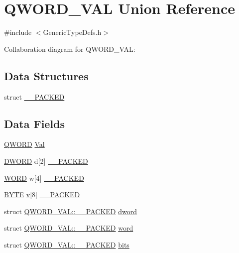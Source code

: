 \hypertarget{union_q_w_o_r_d___v_a_l}{}\section{Q\+W\+O\+R\+D\+\_\+\+V\+A\+L Union Reference}
\label{union_q_w_o_r_d___v_a_l}


{\ttfamily \#include $<$Generic\+Type\+Defs.\+h$>$}



Collaboration diagram for Q\+W\+O\+R\+D\+\_\+\+V\+A\+L\+:
\subsection*{Data Structures}
\begin{DoxyCompactItemize}
\item 
struct \hyperlink{struct_q_w_o_r_d___v_a_l_1_1_____p_a_c_k_e_d}{\+\_\+\+\_\+\+P\+A\+C\+K\+E\+D}
\end{DoxyCompactItemize}
\subsection*{Data Fields}
\begin{DoxyCompactItemize}
\item 
\hyperlink{_generic_type_defs_8h_a15f7b00103384a4b1d6f6e3602be5b15}{Q\+W\+O\+R\+D} \hyperlink{union_q_w_o_r_d___v_a_l_a2b8d25b6ac4b4698966996294ece4580}{Val}
\item 
\hyperlink{_generic_type_defs_8h_ad342ac907eb044443153a22f964bf0af}{D\+W\+O\+R\+D} d\mbox{[}2\mbox{]} \hyperlink{union_q_w_o_r_d___v_a_l_a4c364fe30e2e45ad4e325fb041a8c2cf}{\+\_\+\+\_\+\+P\+A\+C\+K\+E\+D}
\item 
\hyperlink{_generic_type_defs_8h_a2b0e863dadf920709ec53d9088ee7c91}{W\+O\+R\+D} w\mbox{[}4\mbox{]} \hyperlink{union_q_w_o_r_d___v_a_l_abdbe55bfd3a80f5c6cf005d7e37910a7}{\+\_\+\+\_\+\+P\+A\+C\+K\+E\+D}
\item 
\hyperlink{_generic_type_defs_8h_a4ae1dab0fb4b072a66584546209e7d58}{B\+Y\+T\+E} \hyperlink{_s_p_i_flash_8c_a51a3fc6fe361f8f5a7a91799fecd2c9a}{v}\mbox{[}8\mbox{]} \hyperlink{union_q_w_o_r_d___v_a_l_a884b392c82d52eb89059b87a5d288ccf}{\+\_\+\+\_\+\+P\+A\+C\+K\+E\+D}
\item 
struct \hyperlink{struct_q_w_o_r_d___v_a_l_1_1_____p_a_c_k_e_d}{Q\+W\+O\+R\+D\+\_\+\+V\+A\+L\+::\+\_\+\+\_\+\+P\+A\+C\+K\+E\+D} \hyperlink{union_q_w_o_r_d___v_a_l_ab7b7833e9baba96f01a92061705f9684}{dword}
\item 
struct \hyperlink{struct_q_w_o_r_d___v_a_l_1_1_____p_a_c_k_e_d}{Q\+W\+O\+R\+D\+\_\+\+V\+A\+L\+::\+\_\+\+\_\+\+P\+A\+C\+K\+E\+D} \hyperlink{union_q_w_o_r_d___v_a_l_a39f0ae6958f94a2d2e6b49293c9e6f1c}{word}
\item 
struct \hyperlink{struct_q_w_o_r_d___v_a_l_1_1_____p_a_c_k_e_d}{Q\+W\+O\+R\+D\+\_\+\+V\+A\+L\+::\+\_\+\+\_\+\+P\+A\+C\+K\+E\+D} \hyperlink{union_q_w_o_r_d___v_a_l_ad6a4adc2b43c350aea9051781fcc7a30}{bits}
\end{DoxyCompactItemize}


